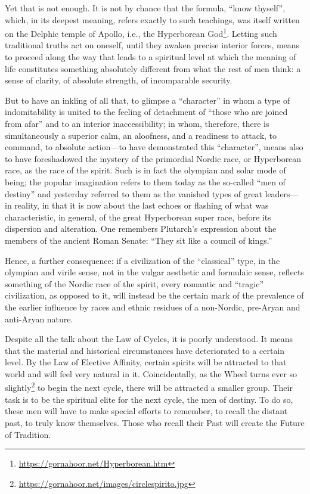 \begin{quotationx}
Yet that is not enough. It is not by chance that the formula, ``know thyself'', which, in its deepest meaning, refers exactly to such teachings, was itself written on the Delphic temple of Apollo, i.e., the Hyperborean God\footnote{\url{https://gornahoor.net/Hyperborean.htm}}. Letting such traditional truths act on oneself, until they awaken precise interior forces, means to proceed along the way that leads to a spiritual level at which the meaning of life constitutes something absolutely different from what the rest of men think: a sense of clarity, of absolute strength, of incomparable security.

But to have an inkling of all that, to glimpse a ``character'' in whom a type of indomitability is united to the feeling of detachment of ``those who are joined from afar'' and to an interior inaccessibility; in whom, therefore, there is simultaneously a superior calm, an aloofness, and a readiness to attack, to command, to absolute action---to have demonstrated this ``character'', means also to have foreshadowed the mystery of the primordial Nordic race, or Hyperborean race, as the race of the spirit. Such is in fact the olympian and solar mode of being; the popular imagination refers to them today as the so-called ``men of destiny'' and yesterday referred to them as the vanished types of great leaders---in reality, in that it is now about the last echoes or flashing of what was characteristic, in general, of the great Hyperborean super race, before its dispersion and alteration. One remembers Plutarch's expression about the members of the ancient Roman Senate: ``They sit like a council of kings.''

Hence, a further consequence: if a civilization of the ``classical'' type, in the olympian and virile sense, not in the vulgar aesthetic and formulaic sense, reflects something of the Nordic race of the spirit, every romantic and ``tragic'' civilization, as opposed to it, will instead be the certain mark of the prevalence of the earlier influence by races and ethnic residues of a non-Nordic, pre-Aryan and anti-Aryan nature.
\end{quotationx}


Despite all the talk about the Law of Cycles, it is poorly understood. It means that the material and historical circumstances have deteriorated to a certain level. By the Law of Elective Affinity, certain spirits will be attracted to that world and will feel very natural in it. Coincidentally, as the Wheel turns ever so slightly\footnote{\url{https://gornahoor.net/images/circlespirito.jpg}} to begin the next cycle, there will be attracted a smaller group. Their task is to be the spiritual elite for the next cycle, the men of destiny. To do so, these men will have to make special efforts to remember, to recall the distant past, to truly know themselves. Those who recall their Past will create the Future of Tradition.


